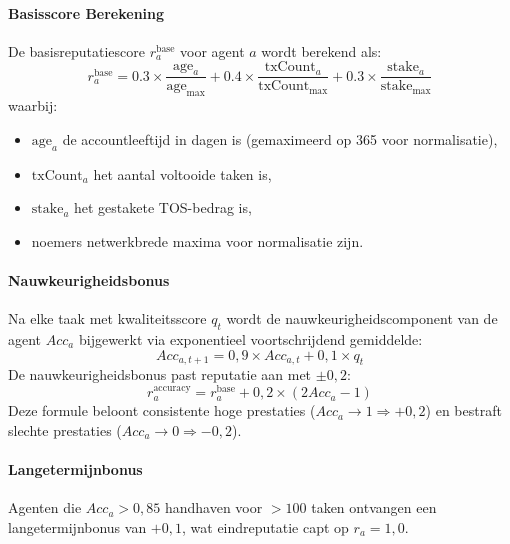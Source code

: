 \documentclass[11pt]{article}
\begin{document}
\paragraph{Basisscore Berekening} De basisreputatiescore $r_a^{\text{base}}$ voor agent $a$ wordt berekend als:
\begin{equation}
r_a^{\text{base}} = 0.3 \times \frac{\text{age}_a}{\text{age}_{\max}} + 0.4 \times \frac{\text{txCount}_a}{\text{txCount}_{\max}} + 0.3 \times \frac{\text{stake}_a}{\text{stake}_{\max}}
\end{equation}
waarbij:
\begin{itemize}[noitemsep]
  \item $\text{age}_a$ de accountleeftijd in dagen is (gemaximeerd op 365 voor normalisatie),
  \item $\text{txCount}_a$ het aantal voltooide taken is,
  \item $\text{stake}_a$ het gestakete TOS-bedrag is,
  \item noemers netwerkbrede maxima voor normalisatie zijn.
\end{itemize}

\paragraph{Nauwkeurigheidsbonus} Na elke taak met kwaliteitsscore $q_t$ wordt de nauwkeurigheidscomponent van de agent $Acc_a$ bijgewerkt via exponentieel voortschrijdend gemiddelde:
\begin{equation}
Acc_{a,t+1} = 0,9 \times Acc_{a,t} + 0,1 \times q_t
\end{equation}
De nauwkeurigheidsbonus past reputatie aan met $\pm 0,2$:
\begin{equation}
r_a^{\text{accuracy}} = r_a^{\text{base}} + 0,2 \times (2 Acc_a - 1)
\end{equation}
Deze formule beloont consistente hoge prestaties ($Acc_a \to 1 \Rightarrow +0,2$) en bestraft slechte prestaties ($Acc_a \to 0 \Rightarrow -0,2$).

\paragraph{Langetermijnbonus} Agenten die $Acc_a > 0,85$ handhaven voor $>100$ taken ontvangen een langetermijnbonus van $+0,1$, wat eindreputatie capt op $r_a = 1,0$.
\end{document}

